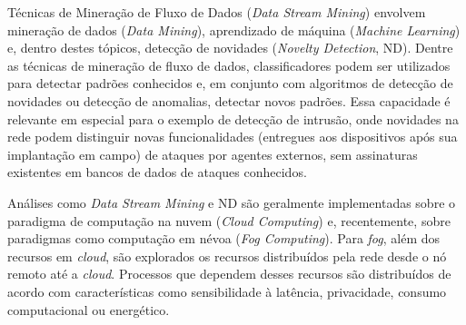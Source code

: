

\newcommand{\nd}{ND\xspace}

Técnicas
de Mineração de Fluxo de Dados (\emph{Data Stream Mining}) envolvem mineração de dados
(\emph{Data Mining}), 
% 
aprendizado de máquina
(\emph{Machine Learning}) e, dentro destes tópicos, detecção de novidades
(\emph{Novelty Detection}, \nd).
Dentre as técnicas de mineração de fluxo de dados, classificadores podem ser
utilizados para detectar padrões conhecidos e, em conjunto com algoritmos de
detecção de novidades ou detecção de anomalias, detectar novos padrões.
Essa capacidade é relevante em especial para o
exemplo de detecção de intrusão, onde novidades na rede podem distinguir novas
funcionalidades (entregues aos dispositivos após sua implantação em campo) de
ataques por agentes externos, sem assinaturas existentes em bancos de
dados de ataques conhecidos.


Análises como \emph{Data Stream Mining} e \nd
são geralmente implementadas
sobre o paradigma de computação na nuvem
(\emph{Cloud Computing}) e, recentemente, sobre paradigmas
como computação em névoa
(\emph{Fog Computing}).
Para \emph{fog}, além dos recursos em \emph{cloud}, são
explorados os recursos distribuídos pela rede desde o nó remoto até a
\emph{cloud}. Processos que dependem desses recursos são distribuídos de acordo
com características como sensibilidade à latência, privacidade,
consumo computacional ou energético.

